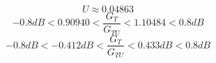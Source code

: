 \[
	U \approx	0.04863
\]
\[
-0.8 dB < 0.90940 < \frac{G_T}{G_{TU}} < 1.10484 < 0.8 dB
\]
\[
-0.8 dB < -0.412 dB< \frac{G_T}{G_{TU}} < 0.433 dB< 0.8 dB
\]
